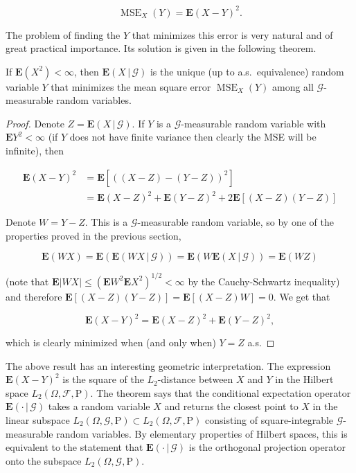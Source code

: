 \[
\operatorname{MSE}_X(Y) = \mathbf{E}(X-Y)^2.
\]

\noindent The problem of finding the $Y$ that minimizes this
error is very natural and of great practical
importance. Its solution is given in the following
theorem.

\begin{thm}
If $\mathbf{E}(X^2)<\infty$, then
$\mathbf{E}\left(X\,|\,\mathcal{G}\right)$ is the
unique (up to a.s.\ equivalence) random variable $Y$
that minimizes the mean square error
$\operatorname{MSE}_X(Y)$ among all
$\mathcal{G}$-measurable random variables.
\end{thm}

\begin{proof}
Denote $Z=\mathbf{E}\left(X\,|\,\mathcal{G}\right)$.
If $Y$ is a $\mathcal{G}$-measurable random variable
with $\mathbf{E} Y^2<\infty$ (if $Y$ does not have
finite variance then clearly the MSE will be
infinite), then

\begin{align*}
\mathbf{E}(X-Y)^2 &= \mathbf{E}[((X-Z)-(Y-Z))^2] \\
&= \mathbf{E}(X-Z)^2 + \mathbf{E}(Y-Z)^2
+ 2 \mathbf{E}[(X-Z)(Y-Z)]
\end{align*}

\noindent Denote $W=Y-Z$. This is a $\mathcal{G}$-measurable
random variable, so by one of the properties proved in
the previous section,

\[
\mathbf{E}(WX) = \mathbf{E}(\mathbf{E}\left(WX\,|\,\mathcal{G}\right))
= \mathbf{E}(W \mathbf{E}\left(X\,|\,\mathcal{G}\right)) = \mathbf{E}(WZ)
\]

\noindent (note that
$\mathbf{E}|WX|\le (\mathbf{E} W^2 \mathbf{E}
X^2)^{1/2}<\infty$
by the Cauchy-Schwartz inequality) and therefore
$\mathbf{E}[(X-Z)(Y-Z)] = \mathbf{E}[(X-Z)W]=0$. We
get that

\[
\mathbf{E}(X-Y)^2 = \mathbf{E}(X-Z)^2 + \mathbf{E}(Y-Z)^2,
\]

\noindent which is clearly minimized when (and only when) $Y=Z$
a.s.
\end{proof}

\noindent The above result has an interesting geometric
interpretation. The expression $\mathbf{E}(X-Y)^2$ is
the square of the $L_2$-distance between $X$ and $Y$
in the Hilbert space
$L_2(\Omega, \mathcal{F},\mathrm{P})$. The theorem
says that the conditional expectation operator
$\mathbf{E}\left(\cdot\,|\,\mathcal{G}\right)$ takes
a random variable $X$ and returns the closest point
to $X$ in the linear subspace
$L_2(\Omega, \mathcal{G},\mathrm{P})\subset
L_2(\Omega, \mathcal{F},\mathrm{P})$
consisting of square-integrable
$\mathcal{G}$-measurable random variables. By
elementary properties of Hilbert spaces, this is
equivalent to the statement that
$\mathbf{E}\left(\cdot\,|\,\mathcal{G}\right)$ is the
orthogonal projection operator onto the subspace
$L_2(\Omega, \mathcal{G},\mathrm{P})$.

